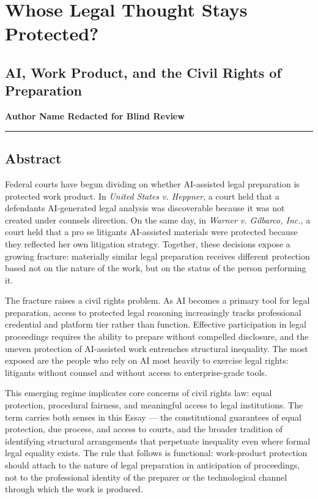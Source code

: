 \documentclass[
  12pt,
]{article}
\author{}
\date{}
\begin{document}
\section{Whose Legal Thought Stays
Protected?}\label{whose-legal-thought-stays-protected}

\subsection{AI, Work Product, and the Civil Rights of
Preparation}\label{ai-work-product-and-the-civil-rights-of-preparation}

\textbf{Author Name Redacted for Blind Review}

\begin{center}\rule{0.5\linewidth}{0.5pt}\end{center}

\subsection{Abstract}\label{abstract}

Federal courts have begun dividing on whether AI-assisted legal
preparation is protected work product. In \emph{United States v.
Heppner}, a court held that a defendant\textquotesingle s AI-generated
legal analysis was discoverable because it was not created under
counsel\textquotesingle s direction. On the same day, in \emph{Warner v.
Gilbarco, Inc.}, a court held that a pro se litigant\textquotesingle s
AI-assisted materials were protected because they reflected her own
litigation strategy. Together, these decisions expose a growing
fracture: materially similar legal preparation receives different
protection based not on the nature of the work, but on the status of the
person performing it.

The fracture raises a civil rights problem. As AI becomes a primary tool
for legal preparation, access to protected legal reasoning increasingly
tracks professional credential and platform tier rather than function.
Effective participation in legal proceedings requires the ability to
prepare without compelled disclosure, and the uneven protection of
AI-assisted work entrenches structural inequality. The most exposed are
the people who rely on AI most heavily to exercise legal rights:
litigants without counsel and without access to enterprise-grade tools.

This emerging regime implicates core concerns of civil rights law: equal
protection, procedural fairness, and meaningful access to legal
institutions. The term carries both senses in this Essay --- the
constitutional guarantees of equal protection, due process, and access
to courts, and the broader tradition of identifying structural
arrangements that perpetuate inequality even where formal legal equality
exists. The rule that follows is functional: work-product protection
should attach to the nature of legal preparation in anticipation of
proceedings, not to the professional identity of the preparer or the
technological channel through which the work is produced.
\end{document}
